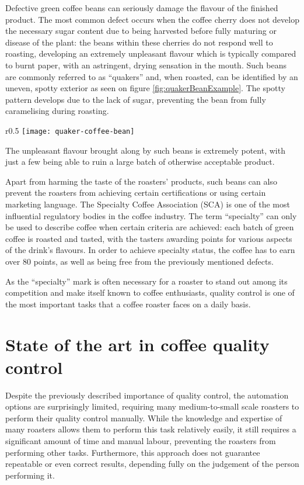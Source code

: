 Defective green coffee beans can seriously damage the flavour of the finished product.
The most common defect occurs when the coffee cherry does not develop the necessary sugar content
due to being harvested before fully maturing or disease of the plant:
the beans within these cherries do not respond well to roasting, developing an extremely unpleasant flavour
which is typically compared to burnt paper, with an astringent, drying sensation in the mouth.
Such beans are commonly referred to as ``quakers'' and, when roasted, can be identified by
an uneven, spotty exterior as seen on figure \ref{fig:quakerBeanExample}.
The spotty pattern develops due to the lack of sugar, preventing the bean from fully caramelising during roasting.
\begin{wrapfigure}{r}{0.5\textwidth}
    \texttt{[image: quaker-coffee-bean]}
    \caption*{Source: \cite{quakerBeanImg}}
    \caption{An example of a ``quaker'' coffee bean.}
    \label{fig:quakerBeanExample}
\end{wrapfigure}
The unpleasant flavour brought along by such beans is extremely potent, with just a few being able to ruin a large batch
of otherwise acceptable product.

Apart from harming the taste of the roasters' products, such beans can also prevent the roasters from achieving certain
certifications or using certain marketing language.
The Specialty Coffee Association (SCA) is one of the most influential regulatory bodies in the coffee industry.
The term ``specialty'' can only be used to describe coffee when certain criteria are achieved:
each batch of green coffee is roasted and tasted, with the tasters awarding points for various aspects of the drink's flavours.
In order to achieve specialty status, the coffee has to earn over 80 points, as well as being free from the previously mentioned defects.

As the ``specialty'' mark is often necessary for a roaster to stand out among its competition and make itself known to
coffee enthusiasts, quality control is one of the most important tasks that a coffee roaster faces on a daily basis.

\section{State of the art in coffee quality control}\label{sec:qc-state-of-the-art}
Despite the previously described importance of quality control, the automation options are surprisingly limited,
requiring many medium-to-small scale roasters to perform their quality control manually.
While the knowledge and expertise of many roasters allows them to perform this task relatively easily,
it still requires a significant amount of time and manual labour, preventing the roasters from performing other tasks.
Furthermore, this approach does not guarantee repeatable or even correct results,
depending fully on the judgement of the person performing it.

